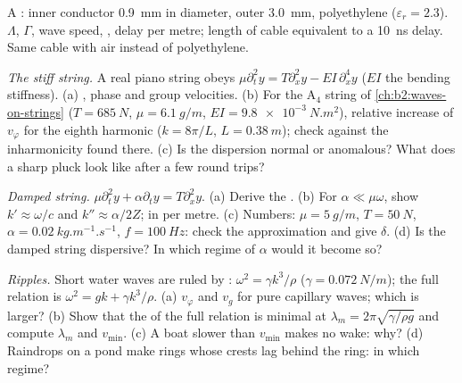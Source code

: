 \begin{exercise}[$\star$]\label{exo:b2:dispersion-wave-packets:4}
A : inner conductor \qty{0.9}{mm} in diameter, outer
\qty{3.0}{mm}, polyethylene ($\varepsilon_r = 2.3$). $\Lambda$, $\Gamma$, wave speed,
, delay per metre; length of cable equivalent
to a \qty{10}{ns} delay. Same cable with air instead of polyethylene.
\end{exercise}

\begin{exercise}[$\star\star$]\label{exo:b2:dispersion-wave-packets:5}
\emph{The stiff string.} A real piano string obeys $\mu\partial_t^2y = T\partial_x^2y
- EI\,\partial_x^4y$ ($EI$ the bending stiffness). (a) ,
phase and group velocities. (b) For the A$_4$ string of
\cref{ch:b2:waves-on-strings} ($T = \qty{685}{N}$, $\mu = \qty{6.1}{g/m}$, $EI =
\qty{9.8e-3}{N.m^2}$), relative increase of $v_\varphi$ for the eighth
harmonic ($k = 8\pi/L$, $L = \qty{0.38}{m}$); check against the inharmonicity
found there. (c) Is the dispersion normal or anomalous? What does a
sharp pluck look like after a few round trips?
\end{exercise}

\begin{exercise}[$\star\star$]\label{exo:b2:dispersion-wave-packets:6}
\emph{Damped string.} $\mu\partial_t^2y + \alpha\partial_ty = T\partial_x^2y$. (a) Derive
the . (b) For $\alpha \ll \mu\omega$, show $k' \approx \omega/c$ and
$k'' \approx \alpha/2Z$;  in  per metre. (c) Numbers: $\mu =
\qty{5}{g/m}$, $T = \qty{50}{N}$, $\alpha = \qty{0.02}{kg.m^{-1}.s^{-1}}$, $f =
\qty{100}{Hz}$: check the approximation and give $\delta$. (d) Is the damped
string dispersive? In which regime of $\alpha$ would it become so?
\end{exercise}

\begin{exercise}[$\star\star$]\label{exo:b2:dispersion-wave-packets:7}
\emph{Ripples.} Short water waves are ruled by : $\omega^2 =
\gamma k^3/\rho$ ($\gamma = \qty{0.072}{N/m}$); the full relation is $\omega^2 = gk +
\gamma k^3/\rho$. (a) $v_\varphi$ and $v_g$ for pure capillary waves; which is
larger? (b) Show that the  of the full relation is
minimal at $\lambda_m = 2\pi\sqrt{\gamma/\rho g}$ and compute $\lambda_m$ and $v_{\min}$.
(c) A boat slower than $v_{\min}$ makes no wake: why? (d) Raindrops on a
pond make rings whose crests lag behind the ring: in which regime?
\end{exercise}


